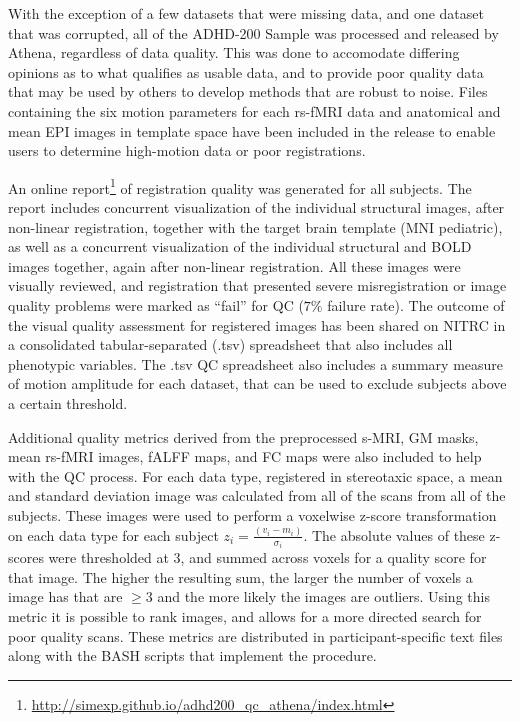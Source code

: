 \documentclass[preprint,12pt,3p]{elsarticle}
\begin{document}
With the exception of a few datasets that were missing data, and one dataset that was corrupted, all of the ADHD-200 Sample was processed and released by Athena, regardless of data quality. This was done to accomodate differing opinions as to what qualifies as usable data, and to provide poor quality data that may be used by others to develop methods that are robust to noise. Files containing the six motion parameters for each rs-fMRI data and anatomical and mean EPI images in template space have been included in the release to enable users to determine high-motion data or poor registrations. 
\par
An online report\footnote{\url{http://simexp.github.io/adhd200_qc_athena/index.html}} of registration quality was generated for all subjects. The report includes concurrent visualization of the individual structural images, after non-linear registration, together with the target brain template (MNI pediatric), as well as a concurrent visualization of the individual structural and BOLD images together, again after non-linear registration. All these images were visually reviewed, and registration that presented severe misregistration or image quality problems were marked as ``fail'' for QC ($7\%$ failure rate). The outcome of the visual quality assessment for registered images has been shared on NITRC in a consolidated tabular-separated (.tsv) spreadsheet that also includes all phenotypic variables. The .tsv QC spreadsheet also includes a summary measure of motion amplitude for each dataset, that can be used to exclude subjects above a certain threshold. 
\par
Additional quality metrics derived from the preprocessed s-MRI, GM masks, mean rs-fMRI images, fALFF maps, and FC maps were also included to help with the QC process. For each data type, registered in stereotaxic space,  a mean and standard deviation image was calculated from all of the scans from all of the subjects. These images were used to perform a voxelwise z-score transformation on each data type for each subject $z_i = \frac{(v_i-m_i)}{\sigma_i}$. The absolute values of these z-scores were thresholded at 3, and summed across voxels for a quality score for that image. The higher the resulting sum, the larger the number of voxels a image has that are $\geq 3$ and the more likely the images are outliers. Using this metric it is possible to rank images, and allows for a more directed search for poor quality scans. These metrics are distributed in participant-specific text files along with the BASH scripts that implement the procedure.
\end{document}
